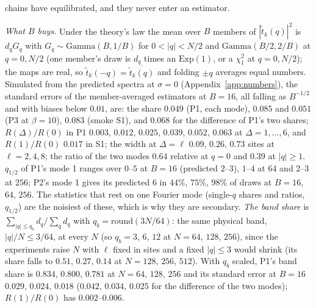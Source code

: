 \documentclass[11pt,a4paper]{article}
\begin{document}
chains have equilibrated, and they never enter an estimator.

\emph{What $B$ buys.} Under the theory's law the mean over $B$ members of $|\tilde t_k(q)|^2$ is $d_qG_q$ with $G_q\sim\mathrm{Gamma}(B, 1/B)$ for $0 < |q| < N/2$ and $\mathrm{Gamma}(B/2, 2/B)$ at $q = 0, N/2$ (one member's draw is $d_q$ times an $\mathrm{Exp}(1)$, or a $\chi^2_1$ at $q = 0, N/2$); the maps are real, so $\tilde t_k(-q) = \overline{\tilde t_k(q)}$ and folding $\pm q$ averages equal numbers. Simulated from the predicted spectra at $\sigma = 0$ (Appendix~\ref{app:numbers}), the standard errors of the member-averaged estimators at $B = 16$, all falling as $B^{-1/2}$ and with biases below $0.01$, are: the share $0.049$ (P1, each mode), $0.085$ and $0.051$ (P3 at $\beta = 10$), $0.083$ (smoke S1), and $0.068$ for the difference of P1's two shares; $R(\Delta)/R(0)$ in P1 $0.003$, $0.012$, $0.025$, $0.039$, $0.052$, $0.063$ at $\Delta = 1,\dots,6$, and $R(1)/R(0)$ $0.017$ in S1; the width at $\Delta = \ell$ $0.09$, $0.26$, $0.73$ sites at $\ell = 2, 4, 8$; the ratio of the two modes $0.64$ relative at $q = 0$ and $0.39$ at $|q|\ge1$. $q_{1/2}$ of P1's mode 1 ranges over $0$--$5$ at $B = 16$ (predicted $2$--$3$), $1$--$4$ at $64$ and $2$--$3$ at $256$; P2's mode 1 gives its predicted $6$ in $44\%$, $75\%$, $98\%$ of draws at $B = 16$, $64$, $256$. The statistics that rest on one Fourier mode (single-$q$ shares and ratios, $q_{1/2}$) are the noisiest of these, which is why they are secondary. \emph{The band share} is $\sum_{|q|\le q_b}d_q/\sum_qd_q$ with $q_b = \mathrm{round}(3N/64)$: the same physical band, $|q|/N\le3/64$, at every $N$ (so $q_b = 3$, $6$, $12$ at $N = 64$, $128$, $256$), since the experiments raise $N$ with $\ell$ fixed in sites and a fixed $|q|\le3$ would shrink (its share falls to $0.51$, $0.27$, $0.14$ at $N = 128$, $256$, $512$). With $q_b$ scaled, P1's band share is $0.834$, $0.800$, $0.781$ at $N = 64$, $128$, $256$ and its standard error at $B = 16$ $0.029$, $0.024$, $0.018$ ($0.042$, $0.034$, $0.025$ for the difference of the two modes); $R(1)/R(0)$ has $0.002$--$0.006$.
\end{document}
